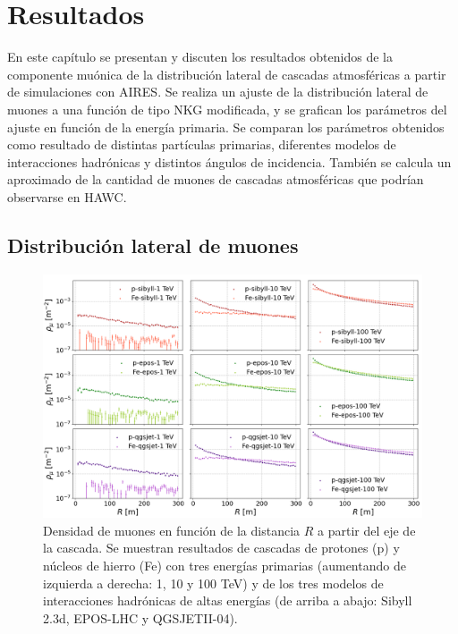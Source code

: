 \documentclass[12pt,letterpaper]{report}
\begin{document}
\chapter{Resultados}

En este cap\'itulo se presentan y discuten los resultados obtenidos de la componente mu\'onica de la distribuci\'on lateral de cascadas atmosf\'ericas a partir de simulaciones con AIRES. Se realiza un ajuste de la distribuci\'on lateral de muones a una funci\'on de tipo NKG modificada, y se grafican los par\'ametros del ajuste en funci\'on de la energ\'ia primaria. Se comparan los par\'ametros obtenidos como resultado de distintas part\'iculas primarias, diferentes modelos de interacciones hadr\'onicas y distintos \'angulos de incidencia. Tambi\'en se calcula un aproximado de la cantidad de muones de cascadas atmosf\'ericas que podr\'ian observarse en HAWC.

\section{Distribuci\'on lateral de muones}
	\begin{figure}[] 
	\includegraphics[width=\textwidth]{Figuras/lateraldist}
	\caption{Densidad de muones en funci\'on de la distancia $R$ a partir del eje de la cascada. Se muestran resultados de cascadas de protones (p) y n\'ucleos de hierro (Fe) con tres energ\'ias primarias (aumentando de izquierda a derecha: 1, 10 y 100 TeV) y de los tres modelos de interacciones hadr\'onicas de altas energ\'ias (de arriba a abajo: Sibyll 2.3d, EPOS-LHC y QGSJETII-04).}
	\label{fig:lateraldist}
	\end{figure}	
	
\end{document}
